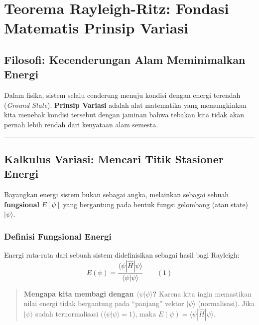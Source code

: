 \section{Teorema Rayleigh-Ritz: Fondasi Matematis Prinsip Variasi}\label{appendix-d}

\hypertarget{filosofi-kecenderungan-alam-meminimalkan-energi}{%
\subsection{Filosofi: Kecenderungan Alam Meminimalkan Energi}\label{filosofi-kecenderungan-alam-meminimalkan-energi}}

Dalam fisika, sistem selalu cenderung menuju kondisi dengan energi terendah (\emph{Ground State}). \textbf{Prinsip Variasi} adalah alat matematika yang memungkinkan kita menebak kondisi tersebut dengan jaminan bahwa tebakan kita tidak akan pernah lebih rendah dari kenyataan alam semesta.

\begin{center}\rule{0.5\linewidth}{0.5pt}\end{center}

\hypertarget{kalkulus-variasi-mencari-titik-stasioner-energi}{%
\subsection{Kalkulus Variasi: Mencari Titik Stasioner Energi}\label{kalkulus-variasi-mencari-titik-stasioner-energi}}

Bayangkan energi sistem bukan sebagai angka, melainkan sebagai sebuah \textbf{fungsional} \(E[\psi]\) yang bergantung pada bentuk fungsi gelombang (atau state) \(|\psi\rangle\).

\hypertarget{a.-definisi-fungsional-energi}{%
\subsubsection{Definisi Fungsional Energi}\label{a.-definisi-fungsional-energi}}

Energi rata-rata dari sebuah sistem didefinisikan sebagai hasil bagi Rayleigh: \[ E(\psi) = \frac{\langle \psi | \hat{H} | \psi \rangle}{\langle \psi | \psi \rangle} \qquad (1) \]

\begin{quote}
\textbf{Mengapa kita membagi dengan \(\langle \psi | \psi \rangle\)?}  Karena kita ingin memastikan nilai energi tidak bergantung pada ``panjang'' vektor \(|\psi\rangle\) (normalisasi). Jika \(|\psi\rangle\) sudah ternormalisasi (\(\langle \psi | \psi \rangle = 1\)), maka \(E(\psi) = \langle \psi | \hat{H} | \psi \rangle\).
\end{quote}

